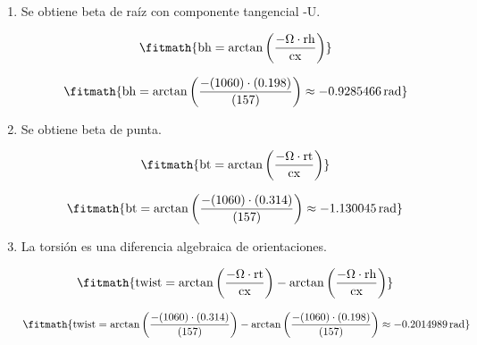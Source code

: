 \begin{enumerate}

\item Se obtiene beta de raíz con componente tangencial -U.

\[\fitmath{\mathrm{bh}=\arctan\left(\frac{-\Omega\cdot \mathrm{rh}}{\mathrm{cx}}\right)}\]

\[\fitmath{\mathrm{bh}=\arctan\left(\frac{-(1060)\cdot (0.198)}{(157)}\right)\approx -0.9285466\,\mathrm{rad}}\]

\item Se obtiene beta de punta.

\[\fitmath{\mathrm{bt}=\arctan\left(\frac{-\Omega\cdot \mathrm{rt}}{\mathrm{cx}}\right)}\]

\[\fitmath{\mathrm{bt}=\arctan\left(\frac{-(1060)\cdot (0.314)}{(157)}\right)\approx -1.130045\,\mathrm{rad}}\]

\item La torsión es una diferencia algebraica de orientaciones.

\[\fitmath{\mathrm{twist}=\arctan\left(\frac{-\Omega\cdot \mathrm{rt}}{\mathrm{cx}}\right)-\arctan\left(\frac{-\Omega\cdot \mathrm{rh}}{\mathrm{cx}}\right)}\]

\[\fitmath{\mathrm{twist}=\arctan\left(\frac{-(1060)\cdot (0.314)}{(157)}\right)-\arctan\left(\frac{-(1060)\cdot (0.198)}{(157)}\right)\approx -0.2014989\,\mathrm{rad}}\]

\end{enumerate}
